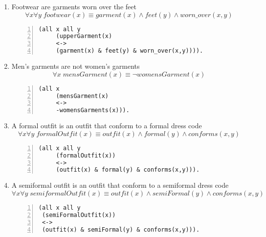 \documentclass[paper=a4, fontsize=11pt]{scrartcl} %
\numberwithin{equation}{section} %
\numberwithin{figure}{section} %
\numberwithin{table}{section} %
\begin{document}
\begin{enumerate}
	
	\item Footwear are garments worn over the feet 
	\begin{equation*}
		\forall x \forall y \; footwear(x) \equiv garment(x) \land feet(y) \land worn\_over(x,y)
	\end{equation*}
	\begin{Verbatim}[frame=lines,gobble=2,numbers=left]
	 (all x all y
	 (upperGarment(x) 
	 <-> 
	 (garment(x) & feet(y) & worn_over(x,y)))). 
	\end{Verbatim}


	\item Men's garments are not women's garments
	\begin{equation*}
		\forall x \; mensGarment(x) \equiv \lnot womensGarment(x)
	\end{equation*}
	\begin{Verbatim}[frame=lines,gobble=2,numbers=left]
	 (all x 
	 (mensGarment(x) 
	 <->
	 -womensGarments(x))).
	\end{Verbatim}
	

	\item A formal outfit is an outfit that conform to a formal dress code
	\begin{equation*}
		\forall x \forall y \; formalOutfit(x) \equiv outfit(x) \land formal(y) \land conforms(x,y)
	\end{equation*}
	\begin{Verbatim}[frame=lines,gobble=2,numbers=left]
	 (all x all y 
	 (formalOutfit(x))
	 <->
	 (outfit(x) & formal(y) & conforms(x,y))).
	\end{Verbatim}

	
	\item A semiformal outfit is an outfit that conform to a semiformal dress code
	\begin{equation*}
		\forall x \forall y \; semiformalOutfit(x) \equiv outfit(x) \land semiFormal(y) \land conforms(x,y)
	\end{equation*}
	\begin{Verbatim}[frame=lines,gobble=2,numbers=left]
 (all x all y 
 (semiFormalOutfit(x))
 <->
 (outfit(x) & semiFormal(y) & conforms(x,y))).
	\end{Verbatim}


\end{enumerate}
\end{document}
